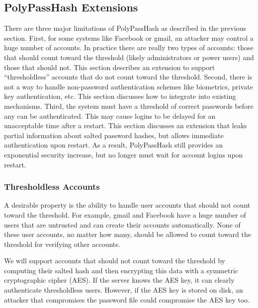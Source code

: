 \subsection{PolyPassHash Extensions}
\label{sec-extensions}

There are three major limitations of PolyPassHash as described in the previous
section.   
First, for some systems like Facebook or gmail, an attacker may control a
huge number of accounts.  In practice there are really two 
types of accounts: those that should count toward the threshold (likely 
administrators or power users) and those that should not.   This section
describes an extension to support ``thresholdless'' accounts that do not 
count toward the threshold.
Second, there is not a way to handle non-password authentication schemes
like biometrics, private key authentication, etc.   This section 
discusses how to integrate into existing mechanisms.   
Third, the system
must have a threshold of correct passwords before any can be authenticated.
This may cause logins to be delayed for an unacceptable time after a restart.
This section discusses an extension that leaks partial information about salted 
password hashes, but allows immediate authentication upon restart.   As a 
result, PolyPassHash still provides an exponential security increase, but 
no longer must wait for account logins upon restart.




\subsubsection{Thresholdless Accounts}
\label{sec-thresholdless}

A desirable property is the ability to handle user accounts that should
not count toward the threshold.  For example, gmail and Facebook have 
a huge number of users that are untrusted and can create their accounts 
automatically.   None of these user accounts, no matter how many, should be
allowed to count toward the threshold for verifying other accounts.   

We will support accounts that should not count toward the threshold by
computing their salted hash and then encrypting this data with
a symmetric cryptographic cipher (AES).   If the server knows the AES key, 
it can clearly authenticate thresholdless users.
However, if the AES key is stored on
disk, an attacker that compromises the password file could compromise the
AES key too.   

